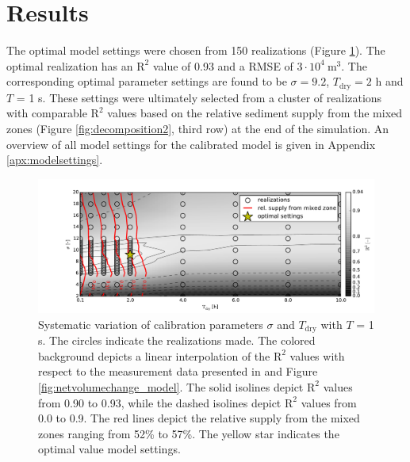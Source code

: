 \section{Results}

The optimal model settings were chosen from 150 realizations (Figure
\ref{fig:calibration}). The optimal realization has an $\mathrm{R^2}$
value of 0.93 and a RMSE of $3 \cdot 10^4 ~ \mathrm{m^3}$.
The corresponding optimal parameter settings are found to be
$\sigma = 9.2$, $T_{\mathrm{dry}} = 2$ h and $T$ = 1 s. These
settings were ultimately selected from a cluster of realizations with
comparable $\mathrm{R^2}$ values based on the relative sediment supply
from the mixed zones (Figure \ref{fig:decomposition2}, third row) at
the end of the simulation. An overview of all model settings for the
calibrated model is given in Appendix \ref{apx:modelsettings}.

\begin{figure}
  \centering
  \includegraphics[width=\columnwidth]{../Figures/calibration}
  \caption{Systematic variation of calibration parameters $\sigma$ and
    $T_{\mathrm{dry}}$ with $T$ = 1 s. The circles indicate the
    realizations made. The colored background depicts a linear
    interpolation of the $\mathrm{R^2}$ values with respect to the
    measurement data presented in \citet{Hoonhout2017a} and Figure
    \ref{fig:netvolumechange_model}. The solid isolines depict
    $\mathrm{R}^2$ values from 0.90 to 0.93, while the dashed isolines
    depict $\mathrm{R}^2$ values from 0.0 to 0.9. The red lines depict
    the relative supply from the mixed zones ranging from 52\% to
    57\%. The yellow star indicates the optimal value model settings.}
  \label{fig:calibration}
\end{figure}


